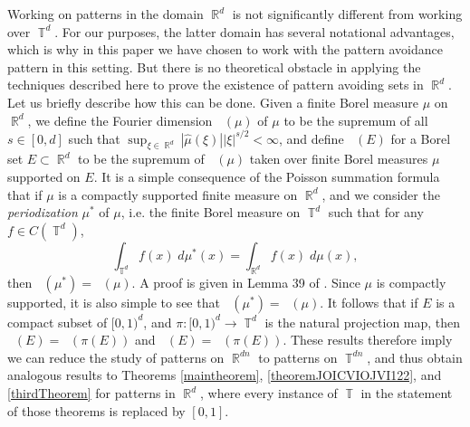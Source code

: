 \documentclass[dvipsnames,letterpaper,12pt]{article}
\numberwithin{equation}{section}
\DeclareMathOperator{\hausdim}{\dim_{\mathbb{H}}}
\DeclareMathOperator{\fordim}{\dim_{\mathbb{F}}}
\DeclareMathOperator{\RR}{\mathbb{R}}
\DeclareMathOperator{\TT}{\mathbb{T}}
\numberwithin{theorem}{section}
\begin{document}
Working on patterns in the domain $\RR^d$ is not significantly different from working over $\TT^d$. For our purposes, the latter domain has several notational advantages, which is why in this paper we have chosen to work with the pattern avoidance pattern in this setting. But there is no theoretical obstacle in applying the techniques described here to prove the existence of pattern avoiding sets in $\RR^d$. Let us briefly describe how this can be done. Given a finite Borel measure $\mu$ on $\RR^d$, we define the Fourier dimension $\fordim(\mu)$ of $\mu$ to be the supremum of all $s \in [0,d]$ such that $\sup_{\xi \in \RR^d} |\widehat{\mu}(\xi)| |\xi|^{s/2} < \infty$, and define $\fordim(E)$ for a Borel set $E \subset \RR^d$ to be the supremum of $\fordim(\mu)$ taken over finite Borel measures $\mu$ supported on $E$. It is a simple consequence of the Poisson summation formula that if $\mu$ is a compactly supported finite measure on $\RR^d$, and we consider the \emph{periodization} $\mu^*$ of $\mu$, i.e. the finite Borel measure on $\TT^d$ such that for any $f \in C(\TT^d)$,
%
\begin{equation}
    \int_{\TT^d} f(x)\; d\mu^*(x) = \int_{\RR^d} f(x)\; d\mu(x),
\end{equation}
%
then $\fordim(\mu^*) = \fordim(\mu)$. A proof is given in Lemma 39 of \cite{MyThesis}. Since $\mu$ is compactly supported, it is also simple to see that $\hausdim(\mu^*) = \hausdim(\mu)$. It follows that if $E$ is a compact subset of $[0,1)^d$, and $\pi: [0,1)^d \to \TT^d$ is the natural projection map, then $\fordim(E) = \fordim(\pi(E))$ and $\hausdim(E) = \hausdim(\pi(E))$. These results therefore imply we can reduce the study of patterns on $\RR^{dn}$ to patterns on $\TT^{dn}$, and thus obtain analogous results to Theorems \ref{maintheorem}, \ref{theoremJOICVIOJVI122}, and \ref{thirdTheorem} for patterns in $\RR^d$, where every instance of $\TT$ in the statement of those theorems is replaced by $[0,1]$.
\end{document}
